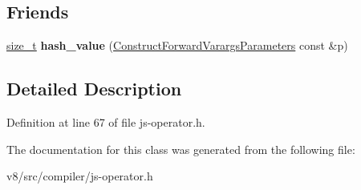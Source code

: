 \subsection*{Friends}
\begin{DoxyCompactItemize}
\item 
\mbox{\label{classv8_1_1internal_1_1compiler_1_1ConstructForwardVarargsParameters_a97a44cea709119513c25161d54474c63}} 
\mbox{\hyperlink{classsize__t}{size\+\_\+t}} {\bfseries hash\+\_\+value} (\mbox{\hyperlink{classv8_1_1internal_1_1compiler_1_1ConstructForwardVarargsParameters}{Construct\+Forward\+Varargs\+Parameters}} const \&p)
\end{DoxyCompactItemize}


\subsection{Detailed Description}


Definition at line 67 of file js-\/operator.\+h.



The documentation for this class was generated from the following file\+:\begin{DoxyCompactItemize}
\item 
v8/src/compiler/js-\/operator.\+h\end{DoxyCompactItemize}
